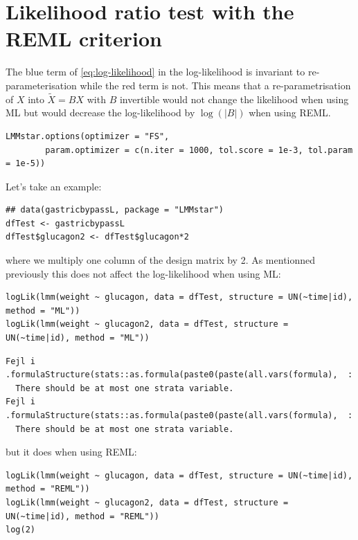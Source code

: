 \documentclass[12pt]{article}
\begin{document}
\clearpage

\section{Likelihood ratio test with the REML criterion}
\label{SM:LRT-REML}
The blue term of \autoref{eq:log-likelihood} in the log-likelihood is
invariant to re-parameterisation while the red term is not. This means
that a re-parametrisation of \(X\) into \(\tilde{X} = B X\) with \(B\)
invertible would not change the likelihood when using ML but would
decrease the log-likelihood by \(\log(|B|)\) when using REML. 
\lstset{language=r,label= ,caption= ,captionpos=b,numbers=none}
\begin{lstlisting}
LMMstar.options(optimizer = "FS",
		param.optimizer = c(n.iter = 1000, tol.score = 1e-3, tol.param = 1e-5))
\end{lstlisting}

\bigskip

Let's take an example:
\lstset{language=r,label= ,caption= ,captionpos=b,numbers=none}
\begin{lstlisting}
## data(gastricbypassL, package = "LMMstar")
dfTest <- gastricbypassL
dfTest$glucagon2 <- dfTest$glucagon*2
\end{lstlisting}

where we multiply one column of the design matrix by 2. As mentionned
previously this does not affect the log-likelihood when using ML:
\lstset{language=r,label= ,caption= ,captionpos=b,numbers=none}
\begin{lstlisting}
logLik(lmm(weight ~ glucagon, data = dfTest, structure = UN(~time|id), method = "ML"))
logLik(lmm(weight ~ glucagon2, data = dfTest, structure = UN(~time|id), method = "ML"))
\end{lstlisting}

\begin{verbatim}
Fejl i .formulaStructure(stats::as.formula(paste0(paste(all.vars(formula),  : 
  There should be at most one strata variable.
Fejl i .formulaStructure(stats::as.formula(paste0(paste(all.vars(formula),  : 
  There should be at most one strata variable.
\end{verbatim}


but it does when using REML:
\lstset{language=r,label= ,caption= ,captionpos=b,numbers=none}
\begin{lstlisting}
logLik(lmm(weight ~ glucagon, data = dfTest, structure = UN(~time|id), method = "REML"))
logLik(lmm(weight ~ glucagon2, data = dfTest, structure = UN(~time|id), method = "REML"))
log(2)
\end{lstlisting}
\end{document}
